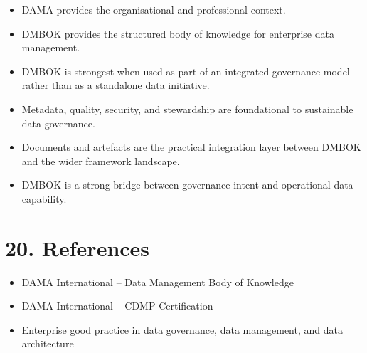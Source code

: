 \documentclass[
  letterpaper,
  DIV=11,
  numbers=noendperiod]{scrartcl}
\providecommand{\tightlist}{%
  \setlength{\itemsep}{0pt}\setlength{\parskip}{0pt}}
\begin{document}
\begin{itemize}
\tightlist
\item
  DAMA provides the organisational and professional context.
\item
  DMBOK provides the structured body of knowledge for enterprise data
  management.
\item
  DMBOK is strongest when used as part of an integrated governance model
  rather than as a standalone data initiative.
\item
  Metadata, quality, security, and stewardship are foundational to
  sustainable data governance.
\item
  Documents and artefacts are the practical integration layer between
  DMBOK and the wider framework landscape.
\item
  DMBOK is a strong bridge between governance intent and operational
  data capability.
\end{itemize}

\section{20. References}\label{references}

\begin{itemize}
\tightlist
\item
  DAMA International -- Data Management Body of Knowledge
\item
  DAMA International -- CDMP Certification
\item
  Enterprise good practice in data governance, data management, and data
  architecture
\end{itemize}
\end{document}
